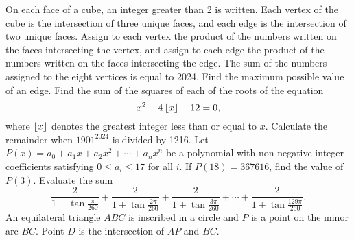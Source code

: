 \begin{enumerate}
    \begin{center}
    \end{center}
    \hyperrefitem[A::2024-S-1-18] On each face of a cube, an integer greater than 2 is written. Each vertex of the cube is the intersection of three unique faces, and each edge is the intersection of two unique faces. Assign to each vertex the product of the numbers written on the faces intersecting the vertex, and assign to each edge the product of the numbers written on the faces intersecting the edge. The sum of the numbers assigned to the eight vertices is equal to 2024. Find the maximum possible value of an edge.
    \hyperrefitem[A::2024-S-1-19] Find the sum of the squares of each of the roots of the equation \[x^2 - 4\left\lfloor x \right\rfloor - 12 = 0,\] where $\left\lfloor x \right\rfloor$ denotes the greatest integer less than or equal to $x$.
    \hyperrefitem[A::2024-S-1-20] Calculate the remainder when $1901^{2024}$ is divided by 1216.
    \hyperrefitem[A::2024-S-1-21] Let $P(x) = a_0 + a_1 x + a_2 x^2 + \cdots + a_n x^n$ be a polynomial with non-negative integer coefficients satisfying $0 \leq a_i \leq 17$ for all $i$. If $P(18) = 367616$, find the value of $P(3)$.
    \hyperrefitem[A::2024-S-1-22] Evaluate the sum \[\frac{2}{1 + \tan{\frac{\pi}{260}}} + \frac{2}{1 + \tan{\frac{2\pi}{260}}} + \frac{2}{1 + \tan{\frac{3\pi}{260}}} + \cdots + \frac{2}{1 + \tan{\frac{129\pi}{260}}}.\]
    \hyperrefitem[A::2024-S-1-23] An equilateral triangle $ABC$ is inscribed in a circle and $P$ is a point on the minor arc $BC$. Point $D$ is the intersection of $AP$ and $BC$.

    \begin{center}
\end{center}
\end{enumerate}
